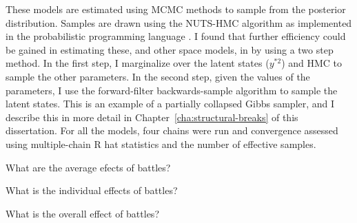 These models are estimated using MCMC methods to sample from the posterior distribution.
Samples are drawn using the NUTS-HMC algorithm as implemented in the probabilistic programming language \Stan{} \parencites{Stan2015a}.
I found that further efficiency could be gained in estimating these, and other space models, in \Stan{} by using a two step method. 
In the first step, I marginalize over the latent states ($y^{*2}$) and HMC to sample the other parameters.
In the second step, given the values of the parameters, I use the forward-filter backwards-sample algorithm to sample the latent states.
This is an example of a partially collapsed Gibbs sampler, and I describe this in more detail in Chapter~\ref{cha:structural-breaks} of this dissertation.
For all the models, four chains were run and convergence assessed using multiple-chain R hat statistics and the number of effective samples.


What are the average efects of battles?

What is the individual effects of battles? 

What is the overall effect of battles? 

